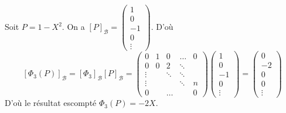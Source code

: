\documentclass{book}
\begin{document}
\begin{Exemple} 
Soit $P=1-X^2$. On a $[P]_\mathcal{B}=\begin{pmatrix}1\\0\\-1\\0\\\vdots \end{pmatrix}$. D'où 
$$[\Phi_3(P)]_\mathcal{B}=  [\Phi _3]_{\mathcal{B}} [P]_\mathcal{B} =\begin{pmatrix} 0 &1&0&\ldots &0 \\
 0& 0&2&\ddots \\
 \vdots &  &\ddots & \ddots \\
  \vdots &  & & \ddots& n\\
 0 &  & \dots& & 0
\end{pmatrix}  \begin{pmatrix}1\\0\\-1\\0\\\vdots \end{pmatrix} = \begin{pmatrix}0\\-2\\0\\0\\\vdots \end{pmatrix}    $$
D'où le résultat escompté $\Phi_3(P)=-2X$.
\end{Exemple}
\end{document}
